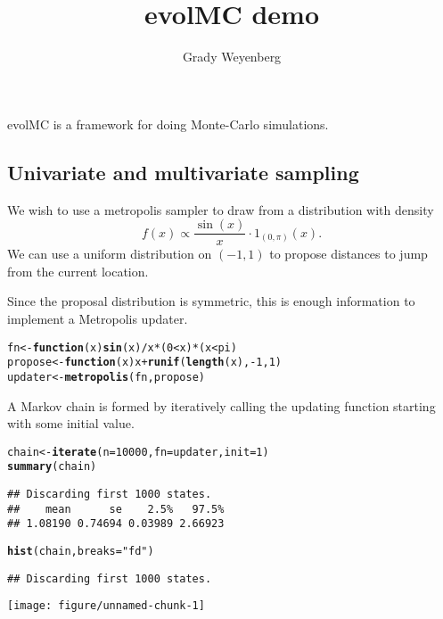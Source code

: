 \documentclass{article}\usepackage[]{graphicx}\usepackage[]{color}
\title{evolMC demo}
\author{Grady Weyenberg}
\makeatletter
\def\maxwidth{ %
  \ifdim\Gin@nat@width>\linewidth
    \linewidth
  \else
    \Gin@nat@width
  \fi
}
\newcommand{\hlnum}[1]{\textcolor[rgb]{0.686,0.059,0.569}{#1}}%
\newcommand{\hlstr}[1]{\textcolor[rgb]{0.192,0.494,0.8}{#1}}%
\newcommand{\hlopt}[1]{\textcolor[rgb]{0,0,0}{#1}}%
\newcommand{\hlstd}[1]{\textcolor[rgb]{0.345,0.345,0.345}{#1}}%
\newcommand{\hlkwa}[1]{\textcolor[rgb]{0.161,0.373,0.58}{\textbf{#1}}}%
\newcommand{\hlkwb}[1]{\textcolor[rgb]{0.69,0.353,0.396}{#1}}%
\newcommand{\hlkwc}[1]{\textcolor[rgb]{0.333,0.667,0.333}{#1}}%
\newcommand{\hlkwd}[1]{\textcolor[rgb]{0.737,0.353,0.396}{\textbf{#1}}}%
\newenvironment{kframe}{%
 \def\at@end@of@kframe{}%
 \ifinner\ifhmode%
  \def\at@end@of@kframe{\end{minipage}}%
  \begin{minipage}{\columnwidth}%
 \fi\fi%
 \def\FrameCommand##1{\hskip\@totalleftmargin \hskip-\fboxsep
 \colorbox{shadecolor}{##1}\hskip-\fboxsep
     \hskip-\linewidth \hskip-\@totalleftmargin \hskip\columnwidth}%
 \MakeFramed {\advance\hsize-\width
   \@totalleftmargin\z@ \linewidth\hsize
   \@setminipage}}%
 {\par\unskip\endMakeFramed%
 \at@end@of@kframe}
\newenvironment{knitrout}{}{} %
\makeatother
\begin{document}
\maketitle

evolMC is a framework for doing Monte-Carlo simulations.

\subsection{Univariate and multivariate sampling}
We wish to use a metropolis sampler to draw from a distribution with
density \[ f(x) \propto \frac{\sin(x)}{x} \cdot 1_{(0,\pi)}(x). \] We
can use a uniform distribution on $(-1,1)$ to propose distances to
jump from the current location.


Since the proposal distribution is symmetric, this is enough
information to implement a Metropolis updater.

\begin{knitrout}
\color{fgcolor}\begin{kframe}
\begin{alltt}
\hlstd{fn} \hlkwb{<-} \hlkwa{function}\hlstd{(}\hlkwc{x}\hlstd{)} \hlkwd{sin}\hlstd{(x)}\hlopt{/}\hlstd{x} \hlopt{*} \hlstd{(}\hlnum{0} \hlopt{<} \hlstd{x)} \hlopt{*} \hlstd{(x} \hlopt{<} \hlstd{pi)}
\hlstd{propose} \hlkwb{<-} \hlkwa{function}\hlstd{(}\hlkwc{x}\hlstd{) x} \hlopt{+} \hlkwd{runif}\hlstd{(}\hlkwd{length}\hlstd{(x),} \hlopt{-}\hlnum{1}\hlstd{,} \hlnum{1}\hlstd{)}
\hlstd{updater} \hlkwb{<-} \hlkwd{metropolis}\hlstd{(fn, propose)}
\end{alltt}
\end{kframe}
\end{knitrout}


A Markov chain is formed by iteratively calling the updating function
starting with some initial value.
\begin{knitrout}
\color{fgcolor}\begin{kframe}
\begin{alltt}
\hlstd{chain} \hlkwb{<-} \hlkwd{iterate}\hlstd{(}\hlkwc{n} \hlstd{=} \hlnum{10000}\hlstd{,} \hlkwc{fn} \hlstd{= updater,} \hlkwc{init} \hlstd{=} \hlnum{1}\hlstd{)}
\hlkwd{summary}\hlstd{(chain)}
\end{alltt}
\begin{verbatim}
## Discarding first 1000 states.
##    mean      se    2.5%   97.5% 
## 1.08190 0.74694 0.03989 2.66923
\end{verbatim}
\begin{alltt}
\hlkwd{hist}\hlstd{(chain,} \hlkwc{breaks} \hlstd{=} \hlstr{"fd"}\hlstd{)}
\end{alltt}
\begin{verbatim}
## Discarding first 1000 states.
\end{verbatim}
\end{kframe}
\texttt{[image: figure/unnamed-chunk-1]} 

\end{knitrout}
\end{document}
